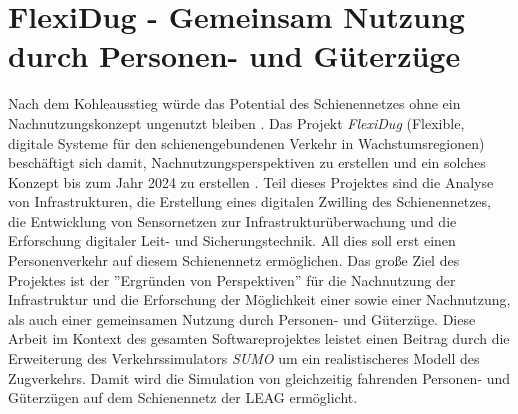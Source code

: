 \section{FlexiDug - Gemeinsam Nutzung durch Personen- und Güterzüge}

Nach dem Kohleausstieg würde das Potential des Schienennetzes ohne ein Nachnutzungskonzept ungenutzt bleiben \cite{rbb_hpi_2022}. Das Projekt \emph{FlexiDug} (Flexible, digitale Systeme für den schienengebundenen Verkehr in Wachstumsregionen) beschäftigt sich damit, Nachnutzungsperspektiven zu erstellen und ein solches Konzept bis zum Jahr 2024 zu erstellen \cite{hasso_plattner_institut_flexidug_2022}. Teil dieses Projektes sind die Analyse von Infrastrukturen, die Erstellung eines digitalen Zwilling des Schienennetzes, die Entwicklung von Sensornetzen zur Infrastrukturüberwachung und die Erforschung digitaler Leit- und Sicherungstechnik. All dies soll erst einen Personenverkehr auf diesem Schienennetz ermöglichen. Das große Ziel des Projektes ist der ''Ergründen von Perspektiven'' für die Nachnutzung der Infrastruktur und die Erforschung der Möglichkeit einer sowie einer Nachnutzung, als auch einer gemeinsamen Nutzung durch Personen- und Güterzüge. \cite{rbb_hpi_2022} Diese Arbeit im Kontext des gesamten Softwareprojektes leistet einen Beitrag durch die Erweiterung des Verkehrssimulators \emph{SUMO} um ein realistischeres Modell des Zugverkehrs. Damit wird die Simulation von gleichzeitig fahrenden Personen- und Güterzügen auf dem Schienennetz der LEAG ermöglicht.
